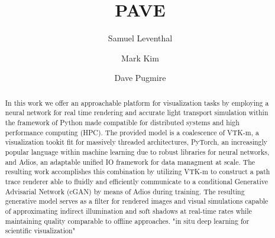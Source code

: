 \documentclass[sigconf,authordraft]{acmart}
\begin{document}
\title{PAVE}

\author{Samuel Leventhal}
\authornotemark[1]
\author{Mark Kim}

\author{Dave Pugmire}


\renewcommand{\shortauthors}{Leventhal and Kim, et al.}

\begin{abstract}
  In this work we offer an approachable platform for visualization tasks by employing a neural network for real time rendering and accurate light transport simulation within the framework of Python made compatible for distributed systems and high performance computing (HPC). The provided model is a coalescence of VTK-m, a visualization tookit fit for massively threaded architectures, PyTorch, an  increasingly popular language within machine learning due to robust libraries for neural networks, and Adios, an adaptable unified IO framework for data managment at scale. The resulting work accomplishes this combination by utilizing VTK-m to construct a path trace renderer able to fluidly and efficiently communicate to a conditional Generative Advisarial Network (cGAN) by means of Adios during training. The resulting generative model serves as a filter for rendered images and visual simulations capable of approximating indirect illumination and soft shadows at real-time rates while maintaining quality comparable to offline approaches. "in situ deep learning for scientific visualization"
\end{abstract}
\end{document}
